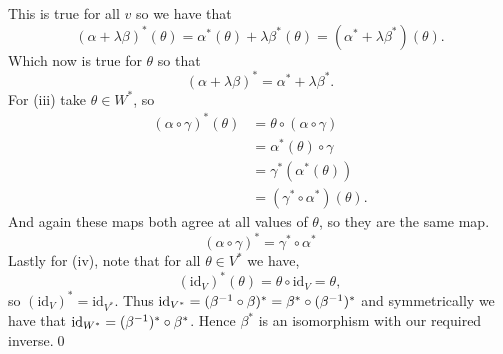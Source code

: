 \documentclass{article}
\renewcommand{\id}{\mathrm{id}}
\begin{document}
This is true for all $ v $ so we have that
\[
	(\alpha+\lambda\beta)^*(\theta)=\alpha^*(\theta)+\lambda\beta^*(\theta)=(\alpha^*+\lambda\beta^*)(\theta).
\]
Which now is true for $ \theta $ so that
\[
	(\alpha+\lambda\beta)^*=\alpha^*+\lambda\beta^*.
\]
For (iii) take $ \theta\in W^* $, so
\begin{align*}
	(\alpha\circ \gamma)^*(\theta)&=\theta\circ(\alpha\circ \gamma)\\
				      &=\alpha^*(\theta)\circ\gamma\\
				      &=\gamma^*(\alpha^*(\theta))\\
				      &=(\gamma^*\circ \alpha^*)(\theta).
\end{align*}
And again these maps both agree at all values of $ \theta $, so they are the same map.
\[
	(\alpha\circ\gamma)^*=\gamma^*\circ\alpha^*
\]
Lastly for (iv), note that for all $ \theta\in V^* $ we have,
\[
	(\id_V)^*(\theta)=\theta\circ\id_V=\theta,
\]
so $ (\id_V)^*=\id_{V^*} $. Thus $ \id_{V^*}=(\inv \beta\circ\beta)^*=\beta^*\circ (\inv\beta)^* $ and symmetrically we have that $ \id_{W^*}=(\inv\beta)^*\circ\beta^* $. Hence $ \beta^* $ is an isomorphism with our required inverse.\qed
\end{document}
